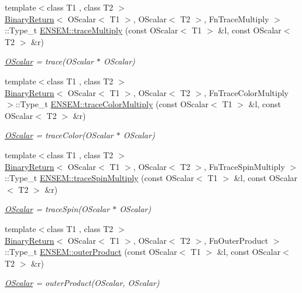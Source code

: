 \begin{DoxyCompactItemize}
{\footnotesize template$<$class T1 , class T2 $>$ }\\\mbox{\hyperlink{structBinaryReturn}{Binary\+Return}}$<$ O\+Scalar$<$ T1 $>$, O\+Scalar$<$ T2 $>$, Fn\+Trace\+Multiply $>$\+::Type\+\_\+t \mbox{\hyperlink{group__obsscalar_ga5b8fcde5132f05c1632c08d0e22c04a7}{E\+N\+S\+E\+M\+::trace\+Multiply}} (const O\+Scalar$<$ T1 $>$ \&l, const O\+Scalar$<$ T2 $>$ \&r)
\begin{DoxyCompactList}\small\item\em \mbox{\hyperlink{classENSEM_1_1OScalar}{O\+Scalar}} = trace(\+O\+Scalar $\ast$ O\+Scalar) \end{DoxyCompactList}\item 
{\footnotesize template$<$class T1 , class T2 $>$ }\\\mbox{\hyperlink{structBinaryReturn}{Binary\+Return}}$<$ O\+Scalar$<$ T1 $>$, O\+Scalar$<$ T2 $>$, Fn\+Trace\+Color\+Multiply $>$\+::Type\+\_\+t \mbox{\hyperlink{group__obsscalar_gabe14ff90818892f233905fa6dad8eb49}{E\+N\+S\+E\+M\+::trace\+Color\+Multiply}} (const O\+Scalar$<$ T1 $>$ \&l, const O\+Scalar$<$ T2 $>$ \&r)
\begin{DoxyCompactList}\small\item\em \mbox{\hyperlink{classENSEM_1_1OScalar}{O\+Scalar}} = trace\+Color(\+O\+Scalar $\ast$ O\+Scalar) \end{DoxyCompactList}\item 
{\footnotesize template$<$class T1 , class T2 $>$ }\\\mbox{\hyperlink{structBinaryReturn}{Binary\+Return}}$<$ O\+Scalar$<$ T1 $>$, O\+Scalar$<$ T2 $>$, Fn\+Trace\+Spin\+Multiply $>$\+::Type\+\_\+t \mbox{\hyperlink{group__obsscalar_ga4f302dae1d100fdae28fb6e784a8bc3b}{E\+N\+S\+E\+M\+::trace\+Spin\+Multiply}} (const O\+Scalar$<$ T1 $>$ \&l, const O\+Scalar$<$ T2 $>$ \&r)
\begin{DoxyCompactList}\small\item\em \mbox{\hyperlink{classENSEM_1_1OScalar}{O\+Scalar}} = trace\+Spin(\+O\+Scalar $\ast$ O\+Scalar) \end{DoxyCompactList}\item 
{\footnotesize template$<$class T1 , class T2 $>$ }\\\mbox{\hyperlink{structBinaryReturn}{Binary\+Return}}$<$ O\+Scalar$<$ T1 $>$, O\+Scalar$<$ T2 $>$, Fn\+Outer\+Product $>$\+::Type\+\_\+t \mbox{\hyperlink{group__obsscalar_ga913f8b40c0c15203e199d1bafc122eea}{E\+N\+S\+E\+M\+::outer\+Product}} (const O\+Scalar$<$ T1 $>$ \&l, const O\+Scalar$<$ T2 $>$ \&r)
\begin{DoxyCompactList}\small\item\em \mbox{\hyperlink{classENSEM_1_1OScalar}{O\+Scalar}} = outer\+Product(\+O\+Scalar, O\+Scalar) \end{DoxyCompactList}\item 

\end{DoxyCompactItemize}

